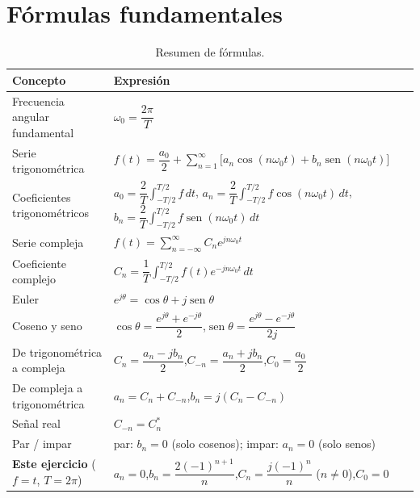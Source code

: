 \documentclass[11pt,a4paper]{article}
\DeclareMathOperator{\sen}{sen}
\begin{document}
\FloatBarrier
\section{Fórmulas fundamentales}
\begin{table}[H]
\centering
\caption{Resumen de fórmulas.}
\renewcommand{\arraystretch}{1.9}
\begin{tabularx}{\textwidth}{>{\raggedright\arraybackslash}p{3.8cm}X}
\toprule
\textbf{Concepto} & \textbf{Expresión}\\
\midrule
Frecuencia angular fundamental & $\omega_0=\dfrac{2\pi}{T}$\\
Serie trigonométrica & $f(t)=\dfrac{a_0}{2}+\displaystyle\sum_{n=1}^{\infty}\big[a_n\cos(n\omega_0t)+b_n\sen(n\omega_0t)\big]$\\
Coeficientes trigonométricos &
  $a_0=\dfrac{2}{T}\displaystyle\int_{-T/2}^{T/2}\!f\,dt$,\quad
  $a_n=\dfrac{2}{T}\displaystyle\int_{-T/2}^{T/2}\!f\cos(n\omega_0t)\,dt$,\quad
  $b_n=\dfrac{2}{T}\displaystyle\int_{-T/2}^{T/2}\!f\sen(n\omega_0t)\,dt$\\
Serie compleja & $f(t)=\displaystyle\sum_{n=-\infty}^{\infty}C_ne^{jn\omega_0t}$\\
Coeficiente complejo & $C_n=\dfrac{1}{T}\displaystyle\int_{-T/2}^{T/2}f(t)e^{-jn\omega_0t}\,dt$\\
Euler & $e^{j\theta}=\cos\theta+j\sen\theta$\\
Coseno y seno & $\cos\theta=\dfrac{e^{j\theta}+e^{-j\theta}}{2}$,\quad $\sen\theta=\dfrac{e^{j\theta}-e^{-j\theta}}{2j}$\\
De trigonométrica a compleja & $C_n=\dfrac{a_n-jb_n}{2}$,\quad $C_{-n}=\dfrac{a_n+jb_n}{2}$,\quad $C_0=\dfrac{a_0}{2}$\\
De compleja a trigonométrica & $a_n=C_n+C_{-n}$,\quad $b_n=j(C_n-C_{-n})$\\
Señal real & $C_{-n}=C_n^{*}$\\
Par / impar & par: $b_n=0$ (solo cosenos); impar: $a_n=0$ (solo senos)\\
\textbf{Este ejercicio} ($f=t$, $T=2\pi$) &
  $a_n=0$,\quad $b_n=\dfrac{2(-1)^{n+1}}{n}$,\quad $C_n=\dfrac{j(-1)^{n}}{n}$ ($n\neq0$),\quad $C_0=0$\\
\bottomrule
\end{tabularx}
\end{table}

\FloatBarrier
\end{document}
